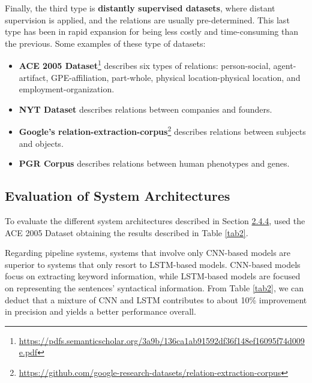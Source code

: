 Finally, the third type is \textbf{distantly supervised datasets}, where distant supervision is applied, and the relations are usually pre-determined. This last type has been in rapid expansion for being less costly and time-consuming than the previous. Some examples of these type of datasets:

\begin{itemize}
    \item \textbf{ACE 2005 Dataset}\footnote{\url{https://pdfs.semanticscholar.org/3a9b/136ca1ab91592df36f148ef16095f74d009e.pdf}} describes six types of relations: person-social, agent-artifact, GPE-affiliation, part-whole, physical location-physical location, and employment-organization. 
    \item \textbf{NYT Dataset} \citep{riedel2010modeling} describes relations between companies and founders. 
    \item \textbf{Google's relation-extraction-corpus}\footnote{\url{https://github.com/google-research-datasets/relation-extraction-corpus}} describes relations between subjects and objects. 
    \item \textbf{PGR Corpus} \citep{sousa2019silver} describes relations between human phenotypes and genes. 
\end{itemize}

\subsection{Evaluation of System Architectures}

To evaluate the different system architectures described in Section \hyperlink{2.4.4}{2.4.4}, \cite{xue2018relation} used the ACE 2005 Dataset obtaining the results described in Table \ref{tab2}. 

Regarding pipeline systems, systems that involve only CNN-based models are superior to systems that only resort to LSTM-based models. CNN-based models focus on extracting keyword information, while LSTM-based models are focused on representing the sentences’ syntactical information. From Table \ref{tab2}, we can deduct that a mixture of CNN and LSTM contributes to about 10\% improvement in precision and yields a better performance overall.

